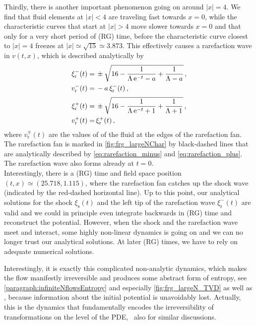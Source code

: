 Thirdly, there is another important phenomenon going on around $| x | = 4$. We find that fluid elements at $| x | < 4$ are traveling fast towards $x = 0$, while the characteristic curves that start at $| x | > 4$ move slower towards $x = 0$ and that only for a very short period of (RG) time, before the characteristic curve closest to $|x| = 4$ freezes at ${| x | \simeq \sqrt{15} \simeq 3.873}$. This effectively causes a rarefaction wave in $v ( t, x )$, which is described analytically by
	\begin{align}
		\xi_\mathrm{r}^- ( t ) = \, & \pm \sqrt{16 - \frac{1}{\Lambda \, \mathrm{e}^{- t} - a} + \frac{1}{\Lambda - a} } \, ,	\label{eq:rarefaction_minus}
		\\
		v_\mathrm{r}^- ( t ) = \, & - a \, \xi_\mathrm{r}^- ( t ) \, ,\\[.2em]
		\xi_\mathrm{r}^+ ( t ) = \, & \pm \sqrt{16 - \frac{1}{\Lambda \, \mathrm{e}^{- t} + 1} + \frac{1}{\Lambda + 1} } \, ,	\label{eq:rarefaction_plus}
		\\
		v_\mathrm{r}^+ ( t ) = \, & \xi_\mathrm{r}^+ ( t ) \, ,	
	\end{align}
where $v_\mathrm{r}^\mp ( t )$ are the values of of the fluid at the edges of the rarefaction fan. The rarefaction fan is marked in \cref{fig:frg_largeNChar} by black-dashed lines that are analytically described by \cref{eq:rarefaction_minus} and \eqref{eq:rarefaction_plus}. The rarefaction wave also forms already at $t = 0$.\\

Interestingly, there is a (RG) time and field space position $( t, x ) \simeq ( 25.718, 1.115 )$, where the rarefaction fan catches up the shock wave (indicated by the {red-dashed} horizontal line). Up to this point, our analytical solutions for the shock $\xi_\mathrm{s} ( t )$ and the left tip of the rarefaction wave $\xi_\mathrm{r}^- ( t )$ are valid and we could in principle even integrate backwards in (RG) time and reconstruct the \uv{} potential. However, when the shock and the rarefaction wave meet and interact, some highly non-linear dynamics is going on and we can no longer trust our analytical solutions. At later (RG) times, we have to rely on adequate numerical solutions.

Interestingly, it is exactly this complicated non-analytic dynamics, which makes the \frg{} flow manifestly irreversible and produces some abstract form of entropy, see \cref{paragraph:infiniteNflowsEntropy} and especially \cref{fig:frg_largeN_TVD} as well as , because information about the \uv{} initial potential is unavoidably lost. Actually, this is the dynamics that fundamentally encodes the irreversibility of \rg{} transformations on the level of the PDE, \cf{}\ also  for similar discussions.

